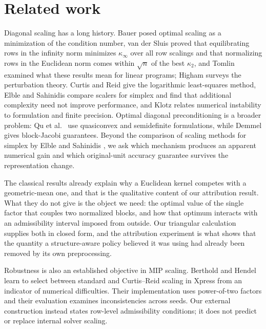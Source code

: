 \section{Related work}
\label{sec:related}
Diagonal scaling has a long history. Bauer \cite{bauer1963scaled} posed optimal scaling
as a minimization of the condition number, van der Sluis \cite{vandersluis1969condition}
proved that equilibrating rows in the infinity norm minimizes $\kappa_\infty$ over all row
scalings and that normalizing rows in the Euclidean norm comes within $\sqrt{n}$ of the best
$\kappa_2$, and Tomlin \cite{tomlin1975scaling} examined what these results mean for linear
programs; Higham \cite[Ch.~9]{higham2002accuracy} surveys the perturbation theory. Curtis and
Reid \cite{curtis1972scaling} give the logarithmic least-squares method, Elble and Sahinidis
\cite{elble2012scaling} compare scalers for simplex and find that additional complexity need
not improve performance, and Klotz \cite{klotz2014numerics} relates numerical instability to
formulation and finite precision. Optimal diagonal preconditioning is a broader problem: Qu et
al.\ \cite{qu2024diagonal} use quasiconvex and semidefinite formulations, while Demmel
\cite{demmel2023block} gives block-Jacobi guarantees.
Beyond the comparison of scaling methods for simplex by Elble and Sahinidis
\cite{elble2012scaling}, we ask which mechanism produces an apparent numerical gain and
which original-unit accuracy guarantee survives the representation change.

The classical results already explain why a Euclidean kernel competes with a geometric-mean one,
and that is the qualitative content of our attribution result. What they do not give is the
object we need: the optimal value of the single factor that couples two normalized blocks, and
how that optimum interacts with an admissibility interval imposed from outside. Our triangular
calculation supplies both in closed form, and the attribution experiment is what shows that the
quantity a structure-aware policy believed it was using had already been removed by its own
preprocessing.

Robustness is also an established objective in MIP scaling. Berthold and Hendel
\cite{berthold2021scaling} learn to select between standard and Curtis--Reid scaling
in Xpress from an indicator of numerical difficulties. Their implementation uses
power-of-two factors and their evaluation examines inconsistencies across seeds.
Our external construction instead states row-level admissibility conditions; it does
not predict or replace internal solver scaling.

